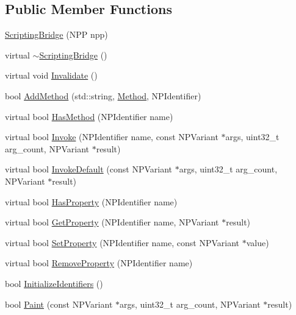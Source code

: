 \subsection*{Public Member Functions}
\begin{DoxyCompactItemize}
\item 
\hyperlink{classbridge_1_1_scripting_bridge_a9f6cceea3738d76e33f47ba8ad5f72d9}{ScriptingBridge} (NPP npp)
\item 
virtual \hyperlink{classbridge_1_1_scripting_bridge_ae6c311b5f9ffa0a578c7d8e41fa9c23c}{$\sim$ScriptingBridge} ()
\item 
virtual void \hyperlink{classbridge_1_1_scripting_bridge_af00ea5a26438b33f976734a3432dfa9b}{Invalidate} ()
\item 
bool \hyperlink{classbridge_1_1_scripting_bridge_aa5f733424325e07c884397e3f301f01c}{AddMethod} (std::string, \hyperlink{classbridge_1_1_scripting_bridge_aa2d60d52b4e91aa7659850b73f393727}{Method}, NPIdentifier)
\item 
virtual bool \hyperlink{classbridge_1_1_scripting_bridge_a1d614bb3696baef7c46332426ab7a0dc}{HasMethod} (NPIdentifier name)
\item 
virtual bool \hyperlink{classbridge_1_1_scripting_bridge_ad18d2af321b2cba1235876cf281295df}{Invoke} (NPIdentifier name, const NPVariant $\ast$args, uint32\_\-t arg\_\-count, NPVariant $\ast$result)
\item 
virtual bool \hyperlink{classbridge_1_1_scripting_bridge_a2cee828951db15b4cce1074e934c4f97}{InvokeDefault} (const NPVariant $\ast$args, uint32\_\-t arg\_\-count, NPVariant $\ast$result)
\item 
virtual bool \hyperlink{classbridge_1_1_scripting_bridge_aeed261c756896802f26632acfceba1d7}{HasProperty} (NPIdentifier name)
\item 
virtual bool \hyperlink{classbridge_1_1_scripting_bridge_afef889fc2ff5ccabefb713cf7ad5e056}{GetProperty} (NPIdentifier name, NPVariant $\ast$result)
\item 
virtual bool \hyperlink{classbridge_1_1_scripting_bridge_ae73ff0ec0f70dfcd0e22534c8281f3e3}{SetProperty} (NPIdentifier name, const NPVariant $\ast$value)
\item 
virtual bool \hyperlink{classbridge_1_1_scripting_bridge_a861437163b8291eb7b302ce8f778022d}{RemoveProperty} (NPIdentifier name)
\item 
bool \hyperlink{classbridge_1_1_scripting_bridge_a05f2a65b751d12e6aeaa00bfd91ef83f}{InitializeIdentifiers} ()
\item 
bool \hyperlink{classbridge_1_1_scripting_bridge_abfdee6fdc6c4f0cc6007425a14e8384e}{Paint} (const NPVariant $\ast$args, uint32\_\-t arg\_\-count, NPVariant $\ast$result)

\end{DoxyCompactItemize}
